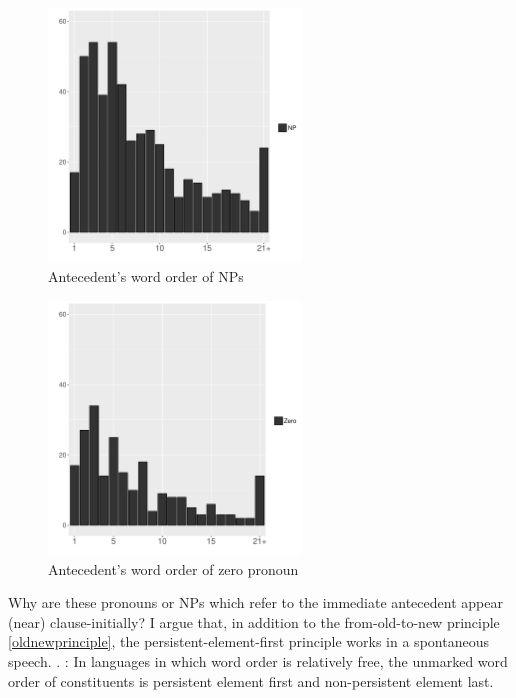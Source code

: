 \begin{figure}
	\begin{center}
	\includegraphics[width=0.6\textwidth]{figure/ExpTypePrevWO.pdf}
	\caption{Antecedent's word order of NPs}
	\label{ExpTypePrevWOF}
	\end{center}
\end{figure}
\begin{figure}
	\begin{center}
	\includegraphics[width=0.6\textwidth]{figure/ExpTypePrevWOZero.pdf}
	\caption{Antecedent's word order of zero pronoun}
	\label{ExpTypePrevWOZeroF}
	\end{center}
\end{figure}

Why are these pronouns or NPs which refer to the immediate antecedent appear (near) clause-initially?
I argue that, in addition to the from-old-to-new principle \ref{oldnewprinciple},
the persistent-element-first principle works in a spontaneous speech.
%
\ex. \label{PerFirstPrinciple}:
 In languages in which word order is relatively free,
 the unmarked word order of constituents is persistent element first and non-persistent element last.

